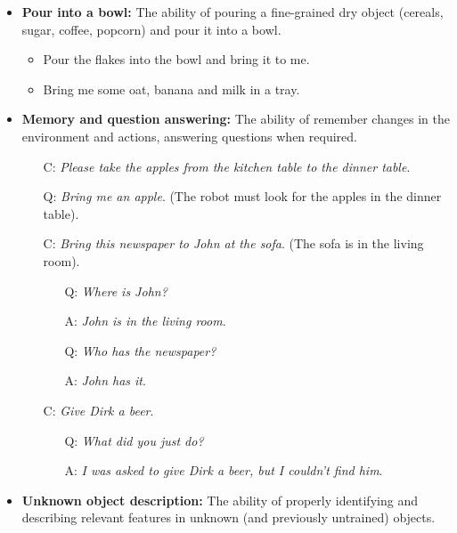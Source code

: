 \begin{itemize}
	\item \textbf{Pour into a bowl:} The ability of pouring a fine-grained dry object (cereals, sugar, coffee, popcorn) and pour it into a bowl.
	\begin{itemize}
		\item Pour the flakes into the bowl and bring it to me.
		\item Bring me some oat, banana and milk in a tray.
	\end{itemize}

	\item \textbf{Memory and question answering:} The ability of remember changes in the environment and actions, answering questions when required.
	\begin{itemize}
		\item[C:] \textit{Please take the apples from the kitchen table to the dinner table}.
		\item[Q:] \textit{Bring me an apple}. (The robot must look for the apples in the dinner table). \\

		\item[C:] \textit{Bring this newspaper to John at the sofa}. (The sofa is in the living room).
		\begin{itemize}
		\item[Q:] \textit{Where is John?}
		\item[A:] \textit{John is in the living room}. \\

		\item[Q:] \textit{Who has the newspaper?}
		\item[A:] \textit{John has it}.
		\end{itemize}

		\item[C:] \textit{Give Dirk a beer}.
		\begin{itemize}
		\item[Q:] \textit{What did you just do?}
		\item[A:] \textit{I was asked to give Dirk a beer, but I couldn't find him}.
		\end{itemize}
	\end{itemize}

	\item \textbf{Unknown object description:} The ability of properly identifying and describing relevant features in unknown (and previously untrained) objects.

\end{itemize}


